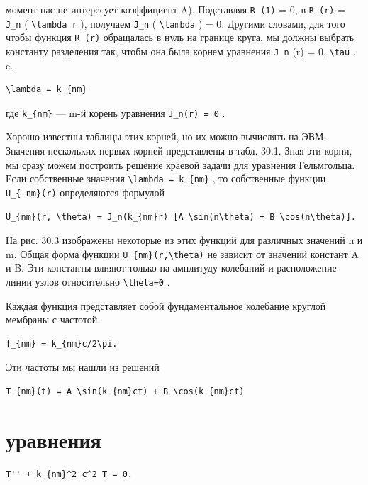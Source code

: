 \documentclass[
  ukrainian,
]{article}
\begin{document}
момент нас не интересует коэффициент A). Подставляя \texttt{R\ (1)} = 0,
в \texttt{R\ (r)} = \texttt{J\_n} ( \texttt{\textbackslash{}lambda\ r}
), получаем \texttt{J\_n} ( \texttt{\textbackslash{}lambda} ) = 0.
Другими словами, для того чтобы функция \texttt{R\ (r)} обращалась в
нуль на границе круга, мы должны выбрать константу разделения так, чтобы
она была корнем уравнения \texttt{J\_n} (r) = 0,
\texttt{\textbackslash{}tau} . e.

\begin{verbatim}
\lambda = k_{nm}
\end{verbatim}

где \texttt{k\_\{nm\}} --- m-й корень уравнения \texttt{J\_n(r)\ =\ 0} .

Хорошо известны таблицы этих корней, но их можно вычислять на ЭВМ.
Значения нескольких первых корней представлены в табл. 30.1. Зная эти
корни, мы сразу можем построить решение краевой задачи для уравнения
Гельмгольца. Если собственные значения
\texttt{\textbackslash{}lambda\ =\ k\_\{nm\}} , то собственные функции
\texttt{U\_\{\ nm\}(r)} определяются формулой

\begin{verbatim}
U_{nm}(r, \theta) = J_n(k_{nm}r) [A \sin(n\theta) + B \cos(n\theta)].
\end{verbatim}

На рис. 30.3 изображены некоторые из этих функций для различных значений
n и m. Общая форма функции \texttt{U\_\{nm\}(r,\textbackslash{}theta)}
не зависит от значений констант A и B. Эти константы влияют только на
амплитуду колебаний и расположение линии узлов относительно
\texttt{\textbackslash{}theta=0} .

Каждая функция представляет собой фундаментальное колебание круглой
мембраны с частотой

\begin{verbatim}
f_{nm} = k_{nm}c/2\pi.
\end{verbatim}

Эти частоты мы нашли из решений

\begin{verbatim}
T_{nm}(t) = A \sin(k_{nm}ct) + B \cos(k_{nm}ct)
\end{verbatim}

\section{уравнения}\label{ux443ux440ux430ux432ux43dux435ux43dux438ux44f}

\begin{verbatim}
T'' + k_{nm}^2 c^2 T = 0.
\end{verbatim}
\end{document}
